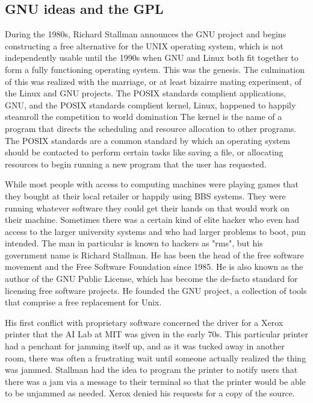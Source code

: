\documentclass[11pt]{article}
\begin{document}
\subsection{GNU ideas and the GPL}

During the 1980s, Richard Stallman announces the GNU project and begins constructing a free alternative for the UNIX operating system, which is not independently usable until the 1990s when GNU and Linux both fit together to form a fully functioning operating system. This was the genesis. The culmination of this was realized with the marriage, or at least bizairre mating experiment, of the Linux and GNU projects. The POSIX standards complient applications, GNU, and the POSIX standards complient kernel, Linux, happened to happily steamroll the competition to world domination The kernel is the name of a program that directs the scheduling and resource allocation to other programs. The POSIX standards are a common standard by which an operating system should be contacted to perform certain tasks like saving a file, or allocating resources to begin running a new program that the user has requested.

While most people with access to computing machines were playing games that they bought at their local retailer or happily using BBS systems. They were running whatever software they could get their hands on that would work on their machine. Sometimes there was a certain kind of elite hacker who even had access to the larger university systems and who had larger problems to boot, pun intended. The man in particular is known to hackers as "rms", but his government name is Richard Stallman. He has been the head of the free software movement and the Free Software Foundation since 1985. He is also known as the author of the GNU Public License, which has become the de-facto standard for licensing free software projects. He founded the GNU project, a collection of tools that comprise a free replacement for Unix.

His first conflict with proprietary software concerned the driver for a Xerox printer that the AI Lab at MIT was given in the early 70s. This particular printer had a penchant for jamming itself up, and as it was tucked away in another room, there was often a frustrating wait until someone actually realized the thing was jammed. Stallman had the idea to program the printer to notify users that there was a jam via a message to their terminal so that the printer would be able to be unjammed as needed. Xerox denied his requests for a copy of the source.
\end{document}
